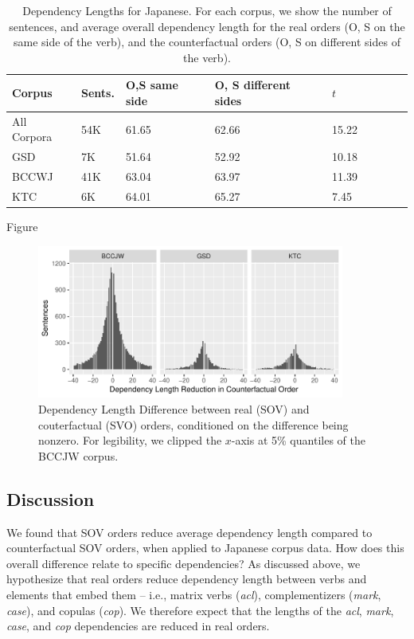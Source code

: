 \documentclass[11pt,a4paper]{article}
\begin{document}
\begin{table}
\begin{center}
\begin{tabular}{l|l|lllllll}
 Corpus                   &   Sents.                     & O,S same side   & O, S different sides  & $t$   \\ \hline\hline
All Corpora     &  54K     & 61.65 & 62.66 &   15.22   \\ \hline
GSD             &   7K       & 51.64 &  52.92  &  10.18  \\
BCCWJ           &   41K       &    63.04   & 63.97 &  11.39  \\
KTC             &   6K   &  64.01 & 65.27 &  7.45\\ \hline
\end{tabular}
\end{center}
\caption{Dependency Lengths for Japanese. For each corpus, we show the number of sentences, and average overall dependency length for the real orders (O, S on the same side of the verb), and the counterfactual orders (O, S on different sides of the verb).}\label{tab:depl-resu}
\end{table}


Figure


\begin{figure}
    \centering
    \includegraphics[width=0.9\textwidth]{figures/dependency_lentgh_differences_byCorpus.pdf}
\caption{Dependency Length Difference between real (SOV) and couterfactual (SVO) orders, conditioned on the difference being nonzero. For legibility, we clipped the $x$-axis at 5\% quantiles of the BCCJW corpus.}\label{fig:memsurp-jap}
\end{figure}




\subsection{Discussion}
We found that SOV orders reduce average dependency length compared to counterfactual SOV orders, when applied to Japanese corpus data.
How does this overall difference relate to specific dependencies? 
As discussed above, we hypothesize that real orders reduce dependency length between verbs and elements that embed them -- i.e., matrix verbs (\emph{acl}), complementizers (\emph{mark}, \emph{case}), and copulas (\emph{cop}).
We therefore expect that the lengths of the \emph{acl}, \emph{mark}, \emph{case}, and \emph{cop} dependencies are reduced in real orders.
\end{document}
